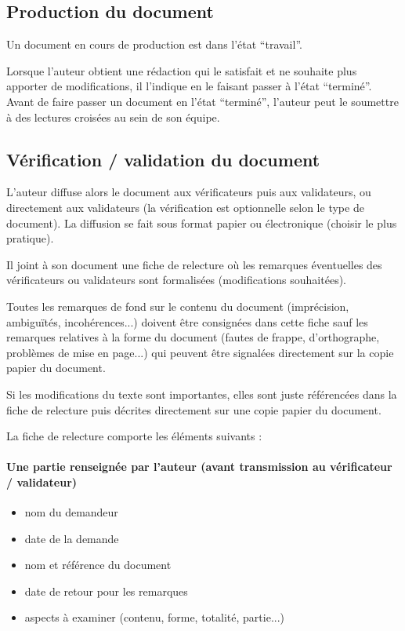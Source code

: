 \documentclass[a4paper]{article}
\begin{document}

\subsection{Production du document}

Un document en cours de production est dans l'état ``travail''.

Lorsque l'auteur obtient une rédaction qui le satisfait et ne souhaite plus apporter de modifications, il l'indique en le faisant passer à l'état ``terminé''.
Avant de faire passer un document en l'état ``terminé'', l'auteur peut le soumettre à des lectures croisées au sein de son équipe.

\subsection{Vérification / validation du document}

L'auteur diffuse alors le document aux vérificateurs puis aux validateurs, ou directement aux validateurs (la vérification est optionnelle selon le type de document). La diffusion se fait sous format papier ou électronique (choisir le plus pratique).

Il joint à son document une fiche de relecture où les remarques éventuelles des vérificateurs ou validateurs sont formalisées (modifications souhaitées).

Toutes les remarques de fond sur le contenu du document (imprécision, ambiguïtés, incohérences...) doivent être consignées dans cette fiche sauf les remarques relatives à la forme du document (fautes de frappe, d'orthographe, problèmes de mise en page...) qui peuvent être signalées directement sur la copie papier du document.

Si les modifications du texte sont importantes, elles sont juste référencées dans la fiche de relecture puis décrites directement sur une copie papier du document.

La fiche de relecture comporte les éléments suivants : 

\paragraph{Une partie renseignée par l'auteur (avant transmission au vérificateur / validateur)}

\begin{itemize}
\item nom du demandeur
\item date de la demande
\item nom et référence du document
\item date de retour pour les remarques
\item aspects à examiner (contenu, forme, totalité, partie...)
\end{itemize}
\end{document}

